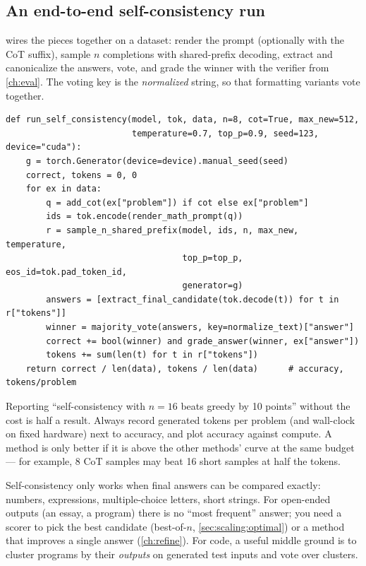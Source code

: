 \subsection{An end-to-end self-consistency run}
 wires the pieces together on a dataset: render the prompt (optionally with
the CoT suffix), sample $n$ completions with shared-prefix decoding, extract and canonicalize the
answers, vote, and grade the winner with the verifier from \cref{ch:eval}. The voting key is the
\emph{normalized} string, so that formatting variants vote together.

\begin{lstlisting}[caption={Self-consistency over a dataset (condensed from \texttt{labs/lab15\_scaling/run.py}).},label={lst:scaling:scrun}]
def run_self_consistency(model, tok, data, n=8, cot=True, max_new=512,
                         temperature=0.7, top_p=0.9, seed=123, device="cuda"):
    g = torch.Generator(device=device).manual_seed(seed)
    correct, tokens = 0, 0
    for ex in data:
        q = add_cot(ex["problem"]) if cot else ex["problem"]
        ids = tok.encode(render_math_prompt(q))
        r = sample_n_shared_prefix(model, ids, n, max_new, temperature,
                                   top_p=top_p, eos_id=tok.pad_token_id,
                                   generator=g)
        answers = [extract_final_candidate(tok.decode(t)) for t in r["tokens"]]
        winner = majority_vote(answers, key=normalize_text)["answer"]
        correct += bool(winner) and grade_answer(winner, ex["answer"])
        tokens += sum(len(t) for t in r["tokens"])
    return correct / len(data), tokens / len(data)      # accuracy, tokens/problem
\end{lstlisting}

\begin{keyidea}
Reporting ``self-consistency with $n=16$ beats greedy by 10 points'' without the cost is half a
result. Always record generated tokens per problem (and wall-clock on fixed hardware) next to
accuracy, and plot accuracy against compute. A method is only better if it is above the other
methods' curve at the same budget --- for example, 8 CoT samples may beat 16 short samples at half
the tokens.
\end{keyidea}

\begin{pitfall}
Self-consistency only works when final answers can be compared exactly: numbers, expressions,
multiple-choice letters, short strings. For open-ended outputs (an essay, a program) there is no
``most frequent'' answer; you need a scorer to pick the best candidate (best-of-$n$,
\cref{sec:scaling:optimal}) or a method that improves a single answer (\cref{ch:refine}). For code,
a useful middle ground is to cluster programs by their \emph{outputs} on generated test inputs and
vote over clusters.
\end{pitfall}

